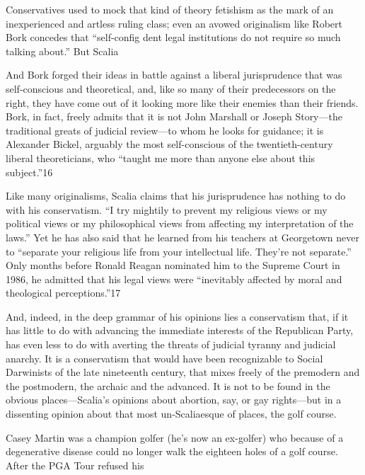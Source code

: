  \par 
Conservatives used to mock that kind of theory fetishism as the mark of an inexperienced and artless ruling class; even an avowed originalism like Robert Bork concedes that “self-config dent legal institutions do not require so much talking about.” But Scalia
 \par 
And Bork forged their ideas in battle against a liberal jurisprudence that was self-conscious and theoretical, and, like so many of their predecessors on the right, they have come out of it looking more like their enemies than their friends. Bork, in fact, freely admits that it is not John Marshall or Joseph Story—the traditional greats of judicial review—to whom he looks for guidance; it is Alexander Bickel, arguably the most self-conscious of the twentieth-century liberal theoreticians, who “taught me more than anyone else about this subject.”{\color{blue}16}
 \par 
Like many originalisms, Scalia claims that his jurisprudence has nothing to do with his conservatism. “I try mightily to prevent my religious views or my political views or my philosophical views from affecting my interpretation of the laws.” Yet he has also said that he learned from his teachers at Georgetown never to “separate your religious life from your intellectual life. They’re not separate.” Only months before Ronald Reagan nominated him to the Supreme Court in 1986, he admitted that his legal views were “inevitably affected by moral and theological perceptions.”{\color{blue}17}
 \par 
And, indeed, in the deep grammar of his opinions lies a conservatism that, if it has little to do with advancing the immediate interests of the Republican Party, has even less to do with averting the threats of judicial tyranny and judicial anarchy. It is a conservatism that would have been recognizable to Social Darwinists of the late nineteenth century, that mixes freely of the premodern and the postmodern, the archaic and the advanced. It is not to be found in the obvious places—Scalia’s opinions about abortion, say, or gay rights—but in a dissenting opinion about that most un-Scaliaesque of places, the golf course.
 \par 
Casey Martin was a champion golfer (he’s now an ex-golfer) who because of a degenerative disease could no longer walk the eighteen holes of a golf course. After the PGA Tour refused his
 \par 
